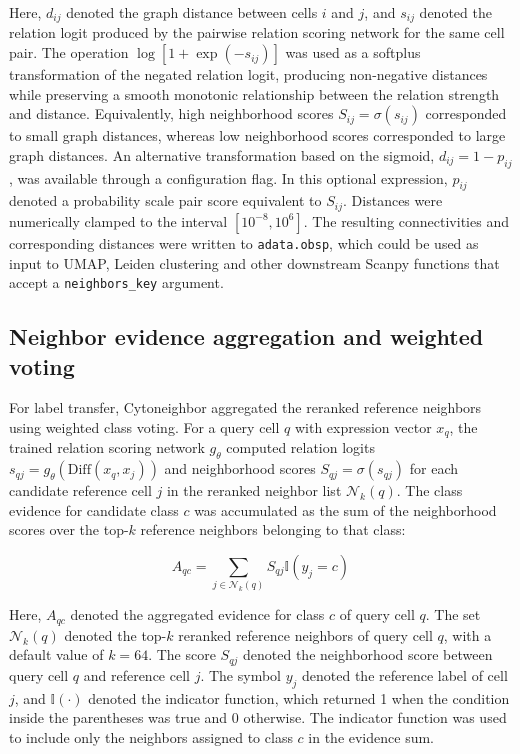 \documentclass[11pt]{article}
\begin{document}
Here, \(d_{ij}\) denoted the graph distance between cells \(i\) and \(j\), and \(s_{ij}\) denoted the relation logit produced by the pairwise relation scoring network for the same cell pair. The operation $\log[1+\exp(-s_{ij})]$ was used as a softplus transformation of the negated relation logit, producing non-negative distances while preserving a smooth monotonic relationship between the relation strength and distance. Equivalently, high neighborhood scores \(S_{ij}=\sigma(s_{ij})\) corresponded to small graph distances, whereas low neighborhood scores corresponded to large graph distances. An alternative transformation based on the sigmoid, $d_{ij}=1-p_{ij}$, was available through a configuration flag. In this optional expression, $p_{ij}$ denoted a probability scale pair score equivalent to $S_{ij}$. Distances were numerically clamped to the interval $[10^{-8},10^{6}]$. The resulting connectivities and corresponding distances were written to \texttt{adata.obsp}, which could be used as input to UMAP, Leiden clustering and other downstream Scanpy functions that accept a \texttt{neighbors\_key} argument.

\subsection*{Neighbor evidence aggregation and weighted voting}

For label transfer, Cytoneighbor aggregated the reranked reference neighbors using weighted class voting. For a query cell \(q\) with expression vector \(x_q\), the trained relation scoring network \(g_{\theta}\) computed relation logits $s_{qj}=g_{\theta}\left(\mathrm{Diff}(x_q,x_j)\right)$ and neighborhood scores \(S_{qj}=\sigma(s_{qj})\) for each candidate reference cell \(j\) in the reranked neighbor list \(\mathcal{N}_k(q)\). The class evidence for candidate class \(c\) was accumulated as the sum of the neighborhood scores over the top-\(k\) reference neighbors belonging to that class:


\begin{equation}
A_{qc}=
\sum_{j\in\mathcal{N}_k(q)}
S_{qj}
\mathbb{I}
\left(
y_j=c
\right)
  \label{eq:A}
\end{equation}

Here, \(A_{qc}\) denoted the aggregated evidence for class \(c\) of query cell \(q\). The set \(\mathcal{N}_k(q)\) denoted the top-\(k\) reranked reference neighbors of query cell \(q\), with a default value of \(k=64\). The score \(S_{qj}\) denoted the neighborhood score between query cell \(q\) and reference cell \(j\). The symbol \(y_j\) denoted the reference label of cell \(j\), and \(\mathbb{I}(\cdot)\) denoted the indicator function, which returned 1 when the condition inside the parentheses was true and 0 otherwise. The indicator function was used to include only the neighbors assigned to class \(c\) in the evidence sum.
\end{document}
